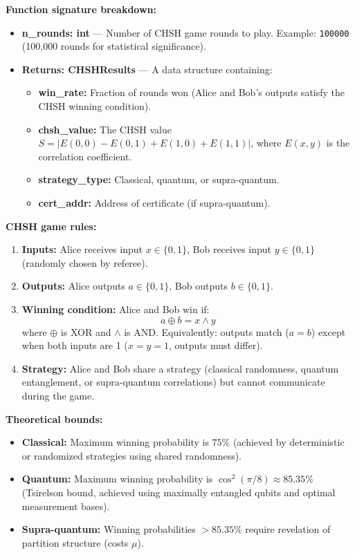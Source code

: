 \textbf{Function signature breakdown:}
\begin{itemize}
    \item \textbf{n\_rounds: int} — Number of CHSH game rounds to play. Example: \texttt{100000} (100,000 rounds for statistical significance).
    
    \item \textbf{Returns: CHSHResults} — A data structure containing:
    \begin{itemize}
        \item \textbf{win\_rate:} Fraction of rounds won (Alice and Bob's outputs satisfy the CHSH winning condition).
        \item \textbf{chsh\_value:} The CHSH value $S = |E(0,0) - E(0,1) + E(1,0) + E(1,1)|$, where $E(x,y)$ is the correlation coefficient.
        \item \textbf{strategy\_type:} Classical, quantum, or supra-quantum.
        \item \textbf{cert\_addr:} Address of certificate (if supra-quantum).
    \end{itemize}
\end{itemize}

\textbf{CHSH game rules:}
\begin{enumerate}
    \item \textbf{Inputs:} Alice receives input $x \in \{0, 1\}$, Bob receives input $y \in \{0, 1\}$ (randomly chosen by referee).
    
    \item \textbf{Outputs:} Alice outputs $a \in \{0, 1\}$, Bob outputs $b \in \{0, 1\}$.
    
    \item \textbf{Winning condition:} Alice and Bob win if:
    \[
    a \oplus b = x \land y
    \]
    where $\oplus$ is XOR and $\land$ is AND. Equivalently: outputs match ($a = b$) except when both inputs are 1 ($x = y = 1$, outputs must differ).
    
    \item \textbf{Strategy:} Alice and Bob share a strategy (classical randomness, quantum entanglement, or supra-quantum correlations) but cannot communicate during the game.
\end{enumerate}

\textbf{Theoretical bounds:}
\begin{itemize}
    \item \textbf{Classical:} Maximum winning probability is $75\%$ (achieved by deterministic or randomized strategies using shared randomness).
    
    \item \textbf{Quantum:} Maximum winning probability is $\cos^2(\pi/8) \approx 85.35\%$ (Tsirelson bound, achieved using maximally entangled qubits and optimal measurement bases).
    
    \item \textbf{Supra-quantum:} Winning probabilities $> 85.35\%$ require revelation of partition structure (costs $\mu$).
\end{itemize}

